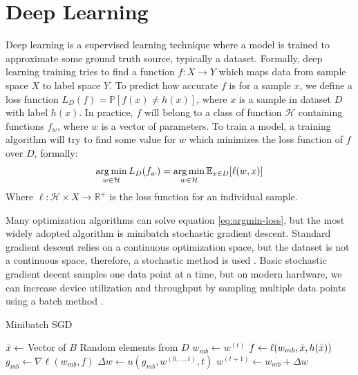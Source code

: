 \section{Deep Learning}
Deep learning is a supervised learning technique where a model is trained to approximate some ground truth source, typically a dataset.
Formally, deep learning training tries to find a function $f: X\longrightarrow Y$ which maps data from sample space $X$ to label space $Y$.
To predict how accurate $f$ is for a sample $x$, we define a loss function $L_D(f)=\mathbb{P}[f(x)\neq h(x)]$, where $x$ is a sample in dataset $D$ with label $h(x)$.
In practice, $f$ will belong to a class of function $\mathcal{H}$ containing functions $f_w$, where $w$ is a vector of parameters.
To train a model, a training algorithm will try to find some value for $w$ which minimizes the loss function of $f$ over $D$, formally:
\begin{equation}
    \operatorname*{arg\,min}_{w\in\mathcal{H}} L_D(f_w) = \operatorname*{arg\,min}_{w\in\mathcal{H}} \mathbb{E}_{x\in D}[\ell (w,x)]
    \label{eq:argmin-loss}
\end{equation} 
Where $\ell:\mathcal{H}\times X\longrightarrow \mathbb{R}^+$ is the loss function for an individual sample. 

Many optimization algorithms can solve equation \ref{eq:argmin-loss}, but the most widely adopted algorithm is minibatch stochastic gradient descent.
Standard gradient descent relies on a continuous optimization space, but the dataset is not a continuous space, therefore, a stochastic method is used \cite{Robbins1951StochasticAproxmethod}.
Basic stochastic gradient decent samples one data point at a time, but on modern hardware, we can increase device utilization and throughput by sampling multiple data points using a batch method \cite{Le2011OnOptMethodsforDL}.

\begin{algorithm}
    \caption{Minibatch SGD}
    \label{alg:MinibatchSGD}
    \begin{algorithmic}[1]
         
        \State $\Bar{x}\leftarrow$ Vector of $B$ Random elements from $D$ 
        \State $w_{mb}\leftarrow w^{(t)}$ 
        \State $f\leftarrow \ell(w_{mb},\Bar{x},h(\Bar{x}))$ 
        \State $g_{mb}\leftarrow \nabla \ell(w_{mb}, f)$ 
        \State $\Delta w \leftarrow u(g_{mb}, w^{(0,...,t)}, t)$ 
        \State $w^{(t+1)}\leftarrow w_{mb} + \Delta w$ 
        \EndFor
    \end{algorithmic}
\end{algorithm}

